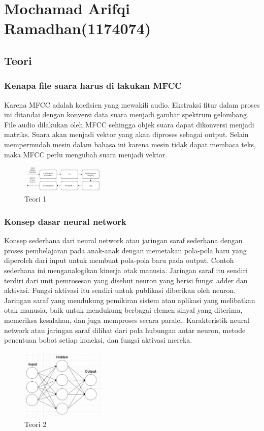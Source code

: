 \section{Mochamad Arifqi Ramadhan(1174074)}
\subsection{Teori}
\subsubsection{Kenapa file suara harus di lakukan MFCC}
\hfill\break
Karena MFCC adalah koefisien yang mewakili audio. Ekstraksi fitur dalam proses ini ditandai dengan konversi data suara menjadi gambar spektrum gelombang. File audio dilakukan oleh MFCC sehingga objek suara dapat dikonversi menjadi matriks. Suara akan menjadi vektor yang akan diproses sebagai output. Selain mempermudah mesin dalam bahasa ini karena mesin tidak dapat membaca teks, maka MFCC perlu mengubah suara menjadi vektor.
\begin{figure}[H]
\centering
	\includegraphics[width=4cm]{figures/1174074/6/1.jpg}
\caption{Teori 1}
\end{figure}

\subsubsection{Konsep dasar neural network}
\hfill\break
Konsep sederhana dari neural network atau jaringan saraf sederhana dengan proses pembelajaran pada anak-anak dengan memetakan pola-pola baru yang diperoleh dari input untuk membuat pola-pola baru pada output. Contoh sederhana ini menganalogikan kinerja otak manusia. Jaringan saraf itu sendiri terdiri dari unit pemrosesan yang disebut neuron yang berisi fungsi adder dan aktivasi. Fungsi aktivasi itu sendiri untuk publikasi diberikan oleh neuron. Jaringan saraf yang mendukung pemikiran sistem atau aplikasi yang melibatkan otak manusia, baik untuk mendukung berbagai elemen sinyal yang diterima, memeriksa kesalahan, dan juga memproses secara paralel. Karakteristik neural network atau jaringan saraf dilihat dari pola hubungan antar neuron, metode penentuan bobot setiap koneksi, dan fungsi aktivasi mereka.
\begin{figure}[H]
\centering
	\includegraphics[width=4cm]{figures/1174074/6/2.jpg}
\caption{Teori 2}
\end{figure}

